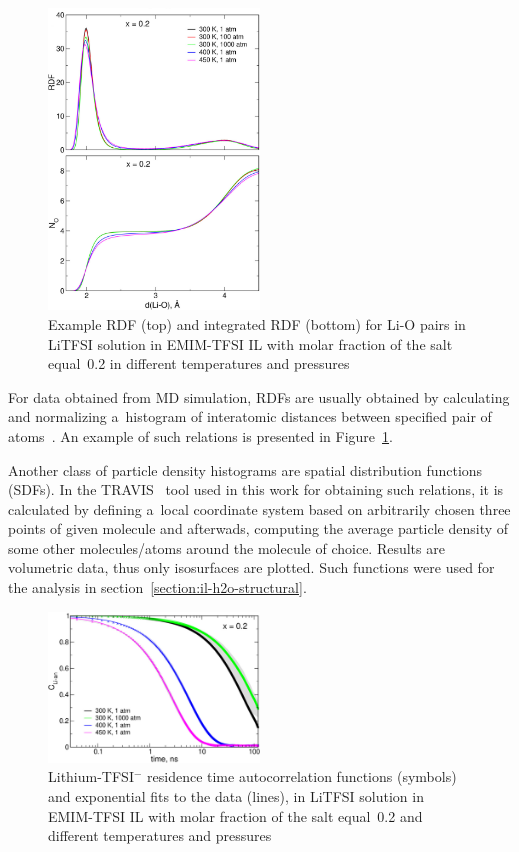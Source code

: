 \begin{figure}[ht]
    \centering
    \includegraphics[width=0.5\textwidth]{img/2-theoretical-methods/rdf-example.png}
    \caption{Example RDF (top) and integrated RDF (bottom) for Li-O pairs in LiTFSI solution in EMIM-TFSI IL with molar fraction of the salt equal~0.2 in different temperatures and pressures~\cite{li-na-continuation}}
    \label{fig:theoretical-methods-rdf-example}
\end{figure}

For data obtained from MD simulation, RDFs are usually obtained by calculating and normalizing a~histogram of interatomic distances between specified pair of atoms~\cite{rdf-histogram}. An example of such relations is presented in Figure~\ref{fig:theoretical-methods-rdf-example}.

Another class of particle density histograms are spatial distribution functions (SDFs). In the TRAVIS~\cite{travis-1,travis-2} tool used in this work for obtaining such relations, it is calculated by defining a~local coordinate system based on arbitrarily chosen three points of given molecule and afterwads, computing the average particle density of some other molecules/atoms around the molecule of choice. Results are volumetric data, thus only isosurfaces are plotted. Such functions were used for the analysis in section~\ref{section:il-h2o-structural}.

\begin{figure}[ht]
    \centering
    \includegraphics[width=0.5\textwidth]{img/2-theoretical-methods/residence-example.png}
    \caption{Lithium-TFSI$^{-}$ residence time autocorrelation functions (symbols) and exponential fits to the data (lines), in LiTFSI solution in EMIM-TFSI IL with molar fraction of the salt equal~0.2 and different temperatures and pressures~\cite{li-na-continuation}}
    \label{fig:theoretical-methods-residence-example}
\end{figure}

